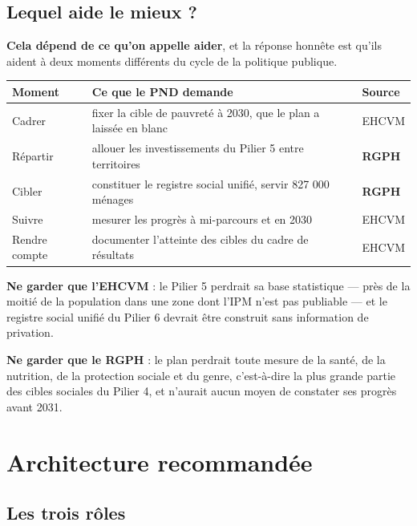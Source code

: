 \documentclass[11pt,a4paper]{article}
\begin{document}
\subsection{Lequel aide le mieux ?}

\textbf{Cela dépend de ce qu'on appelle aider}, et la réponse honnête est qu'ils aident à deux
moments différents du cycle de la politique publique.

\begin{center}
\small
\begin{tabular}{@{}>{\RaggedRight}p{4.6cm}>{\RaggedRight}p{4.6cm}>{\RaggedRight}p{4.6cm}@{}}
\toprule
\textbf{Moment} & \textbf{Ce que le PND demande} & \textbf{Source} \\
\midrule
Cadrer & fixer la cible de pauvreté à 2030, que le plan a laissée en blanc &
  EHCVM \\
Répartir & allouer les investissements du Pilier 5 entre territoires & \textbf{RGPH} \\
Cibler & constituer le registre social unifié, servir 827 000 ménages & \textbf{RGPH} \\
Suivre & mesurer les progrès à mi-parcours et en 2030 & EHCVM \\
Rendre compte & documenter l'atteinte des cibles du cadre de résultats & EHCVM \\
\bottomrule
\end{tabular}
\end{center}

\begin{attention}
\textbf{Ne garder que l'EHCVM} : le Pilier 5 perdrait sa base statistique --- près de la moitié de
la population dans une zone dont l'IPM n'est pas publiable --- et le registre social unifié du
Pilier 6 devrait être construit sans information de privation.

\textbf{Ne garder que le RGPH} : le plan perdrait toute mesure de la santé, de la nutrition, de la
protection sociale et du genre, c'est-à-dire la plus grande partie des cibles sociales du Pilier 4,
et n'aurait aucun moyen de constater ses progrès avant 2031.
\end{attention}

\section{Architecture recommandée}

\subsection{Les trois rôles}
\end{document}
